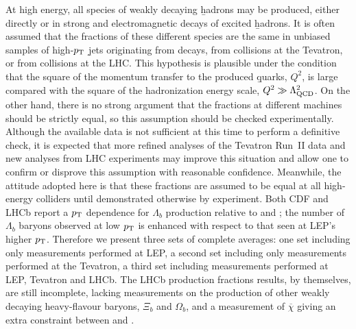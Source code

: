 
At high energy, all species of weakly decaying \b hadrons 
may be produced, either directly or in strong and electromagnetic 
decays of excited \b hadrons. It is often assumed that the fractions 
of these different species are the same in unbiased samples of 
high-$p_{\rm T}$ \b jets originating from  decays, 
from  collisions at the Tevatron, or from 
 collisions at the LHC.
This hypothesis is plausible under the condition that the square of
the momentum transfer to the produced \b quarks, $Q^2$, is large compared 
with the square of the hadronization energy scale, 
$Q^2 \gg \Lambda_{\rm QCD}^2$.
On the other hand, there is no strong argument that the
fractions at different machines should be strictly equal, so 
this assumption should be checked experimentally. Although the 
available data is not sufficient at this time to perform a definitive
check, it is expected that more refined analyses of the Tevatron Run~II data 
and new analyses from LHC 
experiments may improve this situation and allow one to confirm or 
disprove this assumption with reasonable confidence. Meanwhile, the 
attitude adopted here is that these fractions are assumed to be equal 
at all high-energy colliders until demonstrated otherwise by 
experiment.
Both CDF and LHCb report a $p_{\rm T}$ dependence for $\Lambda_b$
production relative to \Bu and \Bd; the number of $\Lambda_b$ baryons
observed at low $p_{\rm T}$ is enhanced with respect to that 
seen at LEP's higher $p_{\rm T}$.
Therefore we present 
three sets of complete averages: one set including only measurements 
performed at LEP, a second set including only measurements performed 
at the Tevatron, a third  set including measurements performed at LEP, 
Tevatron and LHCb.  The LHCb production fractions results, by themselves, 
are still incomplete, lacking measurements on the production of other
weakly decaying heavy-flavour baryons, $\Xi_b$ and $\Omega_b$, and a measurement of 
$\overline{\chi}$ giving an extra constraint between \fBd and \fBs.

